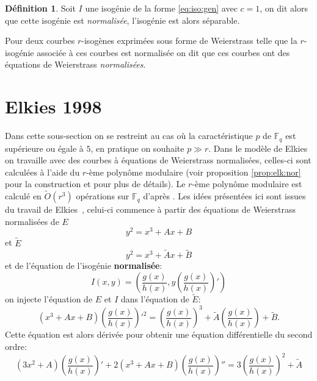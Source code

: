 \documentclass[10pt,a4paper]{book}
\theoremstyle{plain}
\theoremstyle{definition}
\theoremstyle{definition}
\theoremstyle{definition}
\theoremstyle{definition}
\newtheorem{defi}[thm]{Définition}
\theoremstyle{remark}
\theoremstyle{remark}
\theoremstyle{definition}
\begin{document}
\begin{defi}
Soit $I$ une isogénie de la forme \eqref{eq:iso:gen} avec $c=1$, on dit alors 
que cette isogénie est \emph{normalisée}, l'isogénie est alors séparable. 

Pour deux courbes $r$-isogènes exprimées sous forme de Weierstrass telle que
la $r$-isogénie associée à ces courbes est normalisée on dit que ces 
courbes ont des équations de Weierstrass \emph{normalisées}. 
\end{defi}

\section{Elkies 1998}
Dans cette sous-section on se restreint au cas où la caractéristique $p$ de 
$\mathbb{F}_q$ est supérieure ou égale à $5$, en pratique on souhaite $p \gg r$.
Dans le modèle de Elkies on travaille avec des courbes à équations de 
Weierstrass normalisées, celles-ci sont calculées à l'aide du $r$-ème polynôme 
modulaire (voir proposition \ref{prop:elk:nor} pour la construction et 
\cite{Schoof95} pour plus de détails). Le $r$-ème polynôme modulaire est 
calculé en $\tilde{O}(r^3)$ opérations sur $\mathbb{F}_q$ d'après \cite{Enge09} \cite[Algorithm 6.1, Theorem 1]{BLS12}. 
Les idées présentées ici sont issues du travail de Elkies~\cite[§The kernel of
 the isogeny]{elkies1998}, celui-ci commence à partir des équations de 
 Weierstrass normalisées de $E$
\begin{equation}
y^2=x^3+Ax+B
\end{equation}
 et $\tilde{E}$
\begin{equation}
y^2=x^3+\tilde{A}x+\tilde{B}
\end{equation}
et de l'équation de l'isogénie \textbf{normalisée}:
\begin{equation} 
I(x,y)=\left(\frac{g(x)}{h(x)},y\left( \frac{g(x)}{h(x)} \right)'\right) 
\end{equation}
on injecte l'équation de $E$ et $I$ dans l'équation de $\tilde{E}$:
\begin{equation}
(x^3+Ax+B)\left(\frac{g(x)}{h(x)} \right)'^2=  \left(\frac{g(x)}{h(x)} \right)^3 + \tilde{A} \left(\frac{g(x)}{h(x)} \right) + \tilde{B}.
\end{equation}
Cette équation est alors dérivée pour obtenir une équation différentielle du second ordre:
\begin{equation}
\label{eq:Elkies-deriv}
(3x^2+A)\left(\frac{g(x)}{h(x)} \right)'+2(x^3+Ax+B)\left(\frac{g(x)}{h(x)} \right)''=  3\left(\frac{g(x)}{h(x)} \right)^2 + \tilde{A}
\end{equation}
\end{document}
